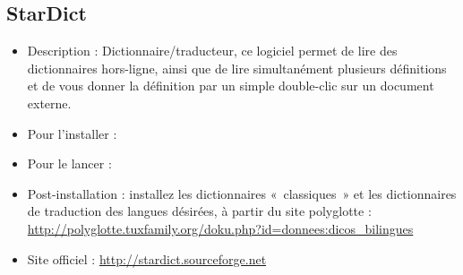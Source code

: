 \subsection{StarDict}
\begin{itemize}
\begingroup
{}
\item Description : Dictionnaire/traducteur, ce logiciel permet de lire des dictionnaires hors-ligne, ainsi que de lire simultanément plusieurs définitions et de vous donner la définition par un simple double-clic sur un document externe.{\par}
\item Pour l'installer : 
\item Pour le lancer : 
\item Post-installation : installez les dictionnaires «~classiques~» et les dictionnaires de traduction des langues désirées, à partir du site polyglotte : \url{http://polyglotte.tuxfamily.org/doku.php?id=donnees:dicos_bilingues}{\par}
\item Site officiel : \url{http://stardict.sourceforge.net}{\par}
\endgroup
\end{itemize}

\newpage
